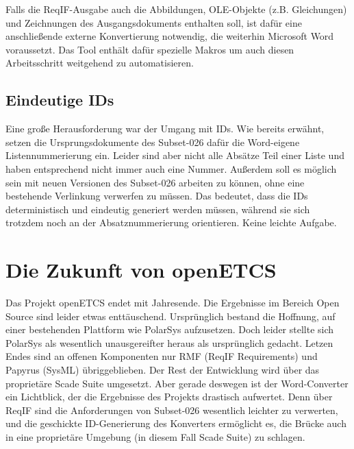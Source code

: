 \documentclass[twoside]{article}
\begin{document}
\begin{multicols}{2}
Falls die ReqIF-Ausgabe auch die Abbildungen, OLE-Objekte (z.B. Gleichungen) und Zeichnungen des Ausgangsdokuments enthalten soll, ist dafür eine anschließende externe Konvertierung notwendig, die weiterhin Microsoft Word voraussetzt. Das Tool enthält dafür spezielle Makros um auch diesen Arbeitsschritt weitgehend zu automatisieren.


\subsection{Eindeutige IDs}
\label{sec:ids}

Eine große Herausforderung war der Umgang mit IDs. Wie bereits erwähnt, setzen die Ursprungsdokumente des Subset-026 dafür die Word-eigene Listennummerierung ein. Leider sind aber nicht alle Absätze Teil einer Liste und haben entsprechend nicht immer auch eine Nummer. Außerdem soll es möglich sein mit neuen Versionen des Subset-026 arbeiten zu können, ohne eine bestehende Verlinkung verwerfen zu müssen. Das bedeutet, dass die IDs deterministisch und eindeutig generiert werden müssen, während sie sich trotzdem noch an der Absatznummerierung orientieren.  Keine leichte Aufgabe.

\section{Die Zukunft von openETCS}

Das Projekt openETCS endet mit Jahresende.  Die Ergebnisse im Bereich Open Source sind leider etwas enttäuschend.  Ursprünglich bestand die Hoffnung, auf einer bestehenden Plattform wie PolarSys aufzusetzen.  Doch leider stellte sich PolarSys als wesentlich unausgereifter heraus als ursprünglich gedacht.  Letzen Endes sind an offenen Komponenten nur RMF (ReqIF Requirements) und Papyrus (SysML) übriggeblieben.  Der Rest der Entwicklung wird über das proprietäre Scade Suite umgesetzt.  Aber gerade deswegen ist der Word-Converter ein Lichtblick, der die Ergebnisse des Projekts drastisch aufwertet. Denn über ReqIF sind die Anforderungen von Subset-026 wesentlich leichter zu verwerten, und die geschickte ID-Generierung des Konverters ermöglicht es, die Brücke auch in eine proprietäre Umgebung (in diesem Fall Scade Suite) zu schlagen.


\end{multicols}
\end{document}
